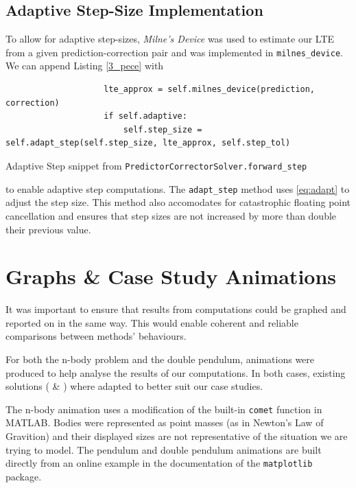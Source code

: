 \documentclass[12pt, twoside]{report}
\theoremstyle{plain}
\theoremstyle{definition}
\theoremstyle{definition}
\begin{document}
        \subsection{Adaptive Step-Size Implementation}
        \label{3_adaptive}
            To allow for adaptive step-sizes, \textit{Milne's Device} was used
            to estimate our LTE from a given prediction-correction pair and was
            implemented in \texttt{milnes_device}. We can append
            Listing \ref{3_pece} with
            \begin{listing}[H]
                \begin{verbatim}
                    lte_approx = self.milnes_device(prediction, correction)
                    if self.adaptive:
                        self.step_size = self.adapt_step(self.step_size, lte_approx, self.step_tol)
                \end{verbatim}
                \caption{Adaptive Step snippet from 
                \texttt{PredictorCorrectorSolver.forward_step}}
                \label{3_adaptive_forward}
            \end{listing}
            \noindent to enable adaptive step computations. The 
            \texttt{adapt_step} method uses \eqref{eq:adapt} to
            adjust the step size. This method also accomodates for catastrophic
            floating point cancellation and ensures that step sizes are not 
            increased by more than double their previous value.

    \section{Graphs \& Case Study Animations}
    \label{3_case_studies}
        It was important to ensure that results from computations could be 
        graphed and reported on in the same way. This would enable coherent
        and reliable comparisons between methods' behaviours. 

        For both the n-body problem and the double pendulum, animations were 
        produced to help analyse the results of our computations. In both cases,
        existing solutions (\cite{multicomet} \& \cite{pendulum}) where adapted
        to better suit our case studies.

        The n-body animation uses a modification of the built-in 
        \texttt{comet} function in MATLAB. Bodies were represented
        as point masses (as in Newton's Law of Gravition) and their displayed
        sizes are not representative of the situation we are trying to model.
        The pendulum and double pendulum animations are built directly from an 
        online example in the documentation of the 
        \texttt{matplotlib} package.
\end{document}
